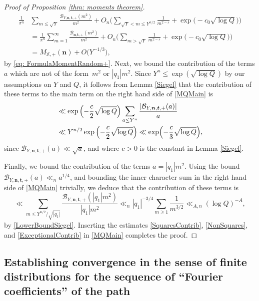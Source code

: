 \documentclass[10pt]{amsart}
\theoremstyle{plain}
\theoremstyle{definition}
\newcommand{\X}{\mathbb{X}}
\newcommand{\B}{\mathcal{B}}
\newcommand{\un}{\boldsymbol{n}}
\newcommand{\ut}{\boldsymbol{t}}
\begin{document}
\begin{proof}[Proof of Proposition \ref{thm: moments theorem}]
\begin{equation}
\begin{aligned}
\frac{1}{\pi^n}&\sum_{m\leq \sqrt{Y}}\frac{\B_{Y,\un, \ut, +}(m^2)}{m^2} + O_n\biggl(\sum_{\sqrt{Y}<m\leq Y^{n/2}}\frac{1}{m^{2-\varepsilon}}+ \exp\bigl(-c_0\sqrt{\log Q}\bigr)\biggr)\\
&= \frac{1}{\pi^n}\sum_{m=1}^{\infty}\frac{\B_{\un, \ut, +}(m^2)}{m^2} + O_n\biggl(\sum_{m> \sqrt{Y}}\frac{1}{m^{2-\varepsilon}}+\exp\bigl(-c_0\sqrt{\log Q}\bigr)\biggr)\\
&= M_{\X, +}(\un)+ O\bigl(Y^{-1/3}\bigr),
\end{aligned}
\end{equation}
by \eqref{eq: FormulaMomentRandom+}.
Next, we bound the contribution of the terms $a$ which are not of the form~$m^2$ or $|q_1|m^2$. Since $Y^n\leq \exp\left(\sqrt{\log Q}\right)$ by our assumptions on $Y$ and $Q$, it follows from Lemma \ref{Siegel} that the contribution of these terms to the main term on the right hand side of \eqref{MQMain} is
\begin{equation}\label{NonSquares}
\begin{aligned}
&\ll \exp\left(-\frac{c}{2}\sqrt{\log Q}\right)\sum_{a\leq Y^n}\frac{|\B_{Y,\un, \ut, +}(a)|}{a}\\
&\ll Y^{n/2} \exp\left(-\frac{c}{2}\sqrt{\log Q}\right) \ll \exp\Bigl(-\frac{c}{3}\sqrt{\log Q}\Bigr),
\end{aligned}
\end{equation}
since $\B_{Y,\un, \ut, +}(a)\ll \sqrt{a}$, and where $c>0$ is the constant in Lemma \ref{Siegel}.

Finally, we bound the contribution of the terms $a=|q_1|m^2$. Using the bound $\B_{Y,\un, \ut, +}(a)\ll_{n} a^{1/4}$, and bounding the inner character sum in the right hand side of \eqref{MQMain} trivially, we deduce that the contribution of these terms is
\begin{equation}\label{ExceptionalContrib}
\ll \sum_{m\leq Y^{n/2}/\sqrt{|q_1|}}\frac{\B_{Y,\un, \ut, +}(|q_1|m^2)}{|q_1|m^2}\ll_{n} |q_1|^{-3/4}\sum_{m\geq 1}\frac{1}{m^{3/2}}\ll_{A, n} (\log Q)^{-A},
\end{equation}
by \eqref{LowerBoundSiegel}.
Inserting the estimates \eqref{SquaresContrib}, \eqref{NonSquares}, and \eqref{ExceptionalContrib} in \eqref{MQMain} completes the proof.
\end{proof}

\subsection{Establishing convergence in the sense of finite distributions for the sequence of ``Fourier coefficients'' of the path}
\end{document}
